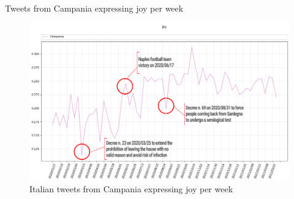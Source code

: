 \documentclass[8pt]{beamer}  %
\begin{document}
\begin{frame}{Tweets from Campania expressing joy per week}
    
    \begin{figure}[H]
        \centering
        \includegraphics[scale=0.3]{assets/img/it_Campania_joy_with_events.png}
        \caption{Italian tweets from Campania expressing joy per week}
        \label{fig:it_Campania_joy}
    \end{figure}
    
\end{frame}
\end{document}
